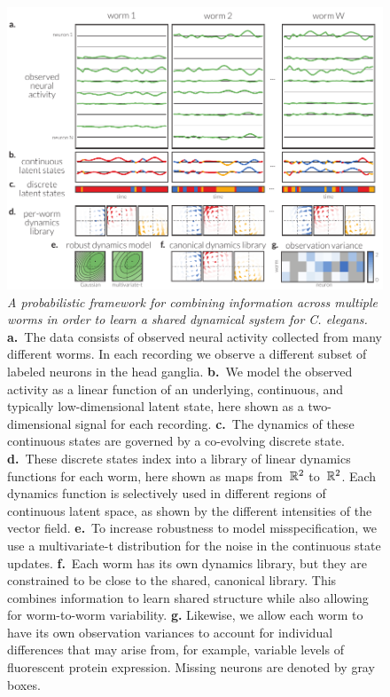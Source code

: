 \documentclass[11pt]{article}
\newcommand{\celegans}{\textit{C. elegans}}
\begin{document}
\begin{figure}[t!]
\centering%
\includegraphics[width=6in]{figures/figure1} 
\caption{
  \textit{A probabilistic framework for combining
  information across multiple worms in order to learn a shared
  dynamical system for \celegans.}
  \textbf{a.}~The data consists of observed neural activity collected
  from many different worms.  In each recording we observe a different
  subset of labeled neurons in the head ganglia.
  \textbf{b.}~We model the observed activity as a linear function of
  an underlying, continuous, and typically low-dimensional latent state,
  here shown as a two-dimensional signal for each recording.
  \textbf{c.}~The dynamics of these continuous states are governed by
  a co-evolving discrete state.
  \textbf{d.}~These discrete states index into a library of linear
  dynamics functions for each worm, here shown as maps from~$\mathbb{R}^2$ to~$\mathbb{R}^2$.
  Each dynamics function is selectively used in different regions of
  continuous latent space, as shown by the different intensities of
  the vector field.
  \textbf{e.}~To increase robustness to model misspecification, we
  use a multivariate-t distribution for the noise in the continuous
  state updates.
  \textbf{f.}~Each worm has its own dynamics library, but they are
  constrained to be close to the shared, canonical library.  This
  combines information to learn shared structure while also allowing
  for worm-to-worm variability.
  \textbf{g.} Likewise, we allow each worm to have its own observation
  variances to account for individual differences that may arise from,
  for example, variable levels of fluorescent protein expression.
  Missing neurons are denoted by gray boxes. 
}
\label{fig:model}
\end{figure}
\end{document}
